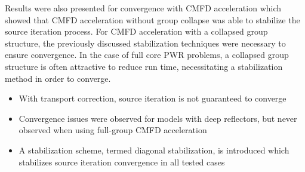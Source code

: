 Results were also presented for convergence with \ac{CMFD} acceleration which showed that \ac{CMFD} acceleration without group collapse was able to stabilize the source iteration process. For \ac{CMFD} acceleration with a collapsed group structure, the previously discussed stabilization techniques were necessary to ensure convergence. In the case of full core \ac{PWR} problems, a collapsed group structure is often attractive to reduce run time, necessitating a stabilization method in order to converge.


\vfill
\begin{highlightsbox}[frametitle=Highlights]
	\begin{itemize}
		
		
		
		\item With transport correction, source iteration is not guaranteed to converge
		
		\item Convergence issues were observed for models with deep reflectors, but never observed when using full-group \ac{CMFD} acceleration
		
		\item A stabilization scheme, termed diagonal stabilization, is introduced which stabilizes source iteration convergence in all tested cases
		
	\end{itemize}
\end{highlightsbox}
\vfill